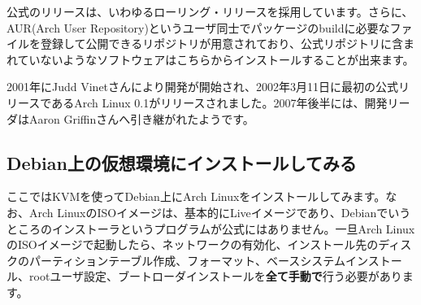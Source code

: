 \documentclass[mingoth,a4paper]{jsarticle}
\begin{document}
 公式のリリースは、いわゆるローリング・リリースを採用しています。さらに、AUR(Arch User Repository)というユーザ同士でパッケージのbuildに必要なファイルを登録して公開できるリポジトリが用意されており、公式リポジトリに含まれていないようなソフトウェアはこちらからインストールすることが出来ます。
 
 2001年にJudd Vinetさんにより開発が開始され、2002年3月11日に最初の公式リリースであるArch Linux 0.1がリリースされました。2007年後半には、開発リーダはAaron Griffinさんへ引き継がれたようです\cite{ref:history-arch-linux}。

\subsection{Debian上の仮想環境にインストールしてみる}

 ここではKVMを使ってDebian上にArch Linuxをインストールしてみます。なお、Arch LinuxのISOイメージは、基本的にLiveイメージであり、Debianでいうところのインストーラというプログラムが公式にはありません。一旦Arch LinuxのISOイメージで起動したら、ネットワークの有効化、インストール先のディスクのパーティションテーブル作成、フォーマット、ベースシステムインストール、rootユーザ設定、ブートローダインストールを{\bf 全て手動で}行う必要があります。
\end{document}
